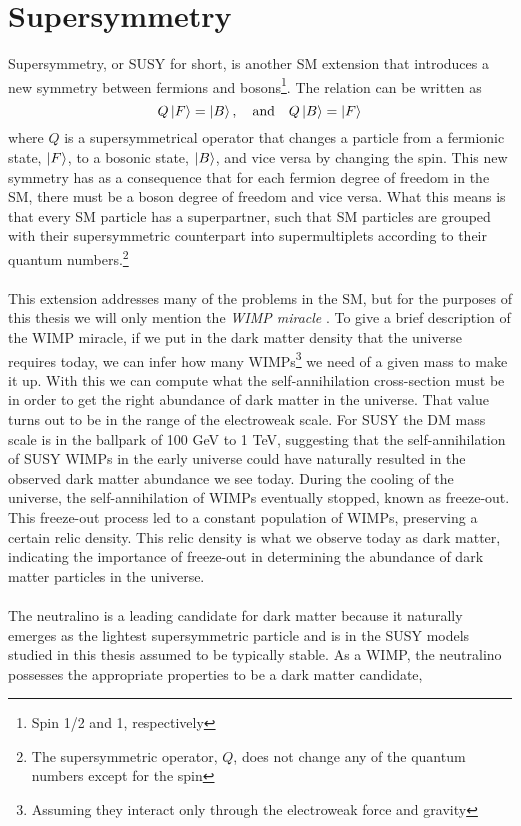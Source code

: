 \documentclass[12pt, a4paper]{book}
\begin{document}
\section{Supersymmetry}
Supersymmetry, or SUSY for short, is another SM extension that introduces a new symmetry between fermions and bosons\footnote{Spin 1/2 and 1, respectively}. The relation can be written as
$$
Q\ket{F} = \ket{B},\quad\text{and}\quad Q\ket{B} = \ket{F}
$$
where $Q$ is a supersymmetrical operator that changes a particle from a fermionic state, $\ket{F}$, to a bosonic state, $\ket{B}$, and vice versa by changing the spin.  This new symmetry has as a consequence that for each fermion degree of freedom in the SM, 
there must be a boson degree of freedom and vice versa. What this means is that every SM particle has a superpartner, such that SM particles are grouped with their supersymmetric counterpart into supermultiplets according to their quantum numbers.\footnote{The supersymmetric operator, $Q$, does not change any of the quantum numbers except for the spin }\\
\\This extension addresses many of the problems in the SM, but for the purposes of this thesis we will only mention the \textit{WIMP miracle} \cite{JUNGMAN1996195}. 
To give a brief description of the WIMP miracle, if we put in the dark matter density that the universe requires today, we can infer how many WIMPs\footnote{Assuming they interact only through the electroweak force and gravity} we need of a given mass to make it up. 
With this we can compute what the self-annihilation cross-section must be in order to get the right abundance of dark matter in the universe.
That value turns out to be in the range of the electroweak scale. For SUSY the DM mass scale is in the ballpark of 100 GeV to 1 TeV, suggesting that the self-annihilation of SUSY WIMPs in the early universe could have naturally resulted in the observed dark matter abundance we see today. 
During the cooling of the universe, the self-annihilation of WIMPs eventually stopped, known as freeze-out. This freeze-out process led to a constant population of WIMPs, preserving a certain relic density. This relic density is what we observe today as dark matter, indicating the importance of freeze-out in determining the abundance of dark matter particles in the universe.\\
\\The neutralino is a leading candidate for dark matter because it naturally emerges as the lightest supersymmetric particle and is in the SUSY models studied in this thesis assumed to be typically stable. As a WIMP, the neutralino possesses the appropriate properties to be a dark matter candidate, 
\end{document}
